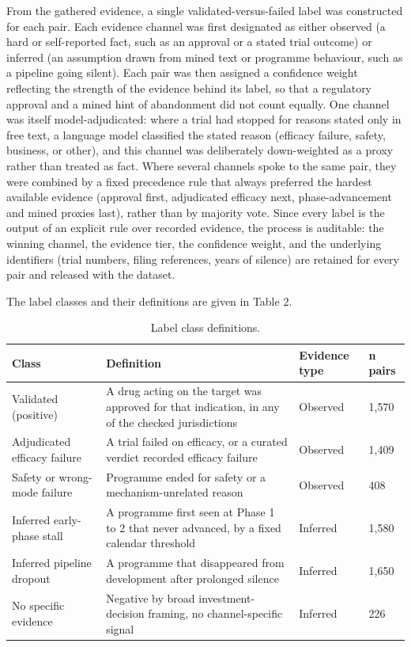\documentclass[11pt,twocolumn]{article}
\begin{document}
From the gathered evidence, a single validated-versus-failed label was constructed for each pair. Each evidence channel was first designated as either observed (a hard or self-reported fact, such as an approval or a stated trial outcome) or inferred (an assumption drawn from mined text or programme behaviour, such as a pipeline going silent). Each pair was then assigned a confidence weight reflecting the strength of the evidence behind its label, so that a regulatory approval and a mined hint of abandonment did not count equally. One channel was itself model-adjudicated: where a trial had stopped for reasons stated only in free text, a language model classified the stated reason (efficacy failure, safety, business, or other), and this channel was deliberately down-weighted as a proxy rather than treated as fact. Where several channels spoke to the same pair, they were combined by a fixed precedence rule that always preferred the hardest available evidence (approval first, adjudicated efficacy next, phase-advancement and mined proxies last), rather than by majority vote. Since every label is the output of an explicit rule over recorded evidence, the process is auditable: the winning channel, the evidence tier, the confidence weight, and the underlying identifiers (trial numbers, filing references, years of silence) are retained for every pair and released with the dataset.

The label classes and their definitions are given in Table 2.

\begin{table}[t]
\centering
\caption{Label class definitions.}
\label{tab:2}
\footnotesize
\begin{tabular}{p{}p{}p{}p{}}
\toprule
Class & Definition & Evidence type & n pairs \\
\midrule
Validated (positive) & A drug acting on the target was approved for that indication, in any of the checked jurisdictions & Observed & 1,570 \\
Adjudicated efficacy failure & A trial failed on efficacy, or a curated verdict recorded efficacy failure & Observed & 1,409 \\
Safety or wrong-mode failure & Programme ended for safety or a mechanism-unrelated reason & Observed & 408 \\
Inferred early-phase stall & A programme first seen at Phase 1 to 2 that never advanced, by a fixed calendar threshold & Inferred & 1,580 \\
Inferred pipeline dropout & A programme that disappeared from development after prolonged silence & Inferred & 1,650 \\
No specific evidence & Negative by broad investment-decision framing, no channel-specific signal & Inferred & 226 \\
\bottomrule
\end{tabular}
\end{table}
\end{document}

